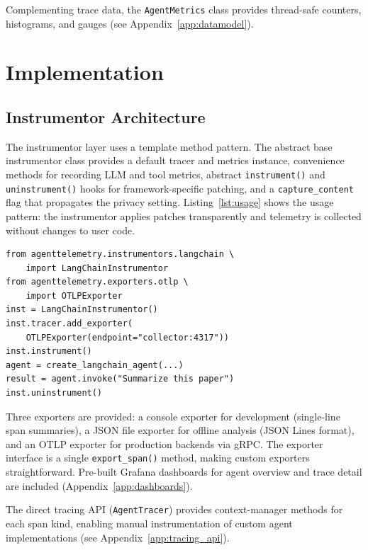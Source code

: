 \documentclass[sigplan,10pt,screen]{acmart}
\begin{document}
Complementing trace data, the \texttt{AgentMetrics} class provides
thread-safe counters, histograms, and gauges (see
Appendix~\ref{app:datamodel}).

\section{Implementation}
\label{sec:implementation}

\subsection{Instrumentor Architecture}
\label{sec:instrumentor}

The instrumentor layer uses a template method pattern.  The
abstract base instrumentor class provides a default tracer and
metrics instance, convenience methods for recording LLM and tool
metrics, abstract \texttt{instrument()} and \texttt{uninstrument()}
hooks for framework-specific patching, and a
\texttt{capture\_content} flag that propagates the privacy setting.
Listing~\ref{lst:usage} shows the usage pattern: the instrumentor
applies patches transparently and telemetry is collected without
changes to user code.

\begin{lstlisting}[caption={Instrumentor usage: automatic telemetry
  requires no user code changes.},
  label={lst:usage},float=t]
from agenttelemetry.instrumentors.langchain \
    import LangChainInstrumentor
from agenttelemetry.exporters.otlp \
    import OTLPExporter
inst = LangChainInstrumentor()
inst.tracer.add_exporter(
    OTLPExporter(endpoint="collector:4317"))
inst.instrument()
agent = create_langchain_agent(...)
result = agent.invoke("Summarize this paper")
inst.uninstrument()
\end{lstlisting}

Three exporters are provided: a console exporter for development
(single-line span summaries), a JSON file exporter for offline
analysis (JSON Lines format), and an OTLP exporter for production
backends via gRPC.  The exporter interface is a single
\texttt{export\_span()} method, making custom exporters
straightforward.  Pre-built Grafana dashboards for agent overview
and trace detail are included (Appendix~\ref{app:dashboards}).

The direct tracing API (\texttt{AgentTracer}) provides context-manager
methods for each span kind, enabling manual instrumentation of custom
agent implementations (see Appendix~\ref{app:tracing_api}).
\end{document}
